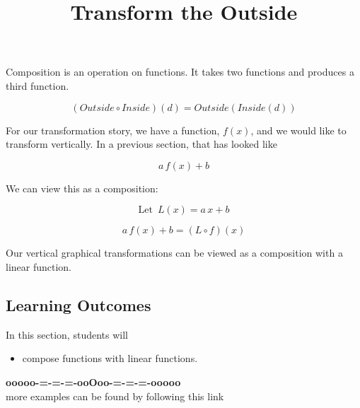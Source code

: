 \documentclass{ximera}
\title{Transform the Outside}
\begin{document}
\begin{abstract}
\end{abstract}
\maketitle









Composition is an operation on functions.  It takes two functions and produces a third function.


\[  (Outside \circ Inside)(d) = Outside(Inside(d))    \]


For our transformation story, we have a function, $f(x)$, and we would like to transform vertically.  In a previous section, that has looked like


\[   a \, f(x) + b  \]


We can view this as a composition:


\[  \text{Let } \, L(x) = a \, x + b   \]


\[   a \, f(x) + b  = (L \circ f)(x)\]



Our vertical graphical transformations can be viewed as a composition with a linear function.





\subsection*{Learning Outcomes}



\begin{sectionOutcomes}
In this section, students will 

\begin{itemize}
\item compose functions with linear functions.
\end{itemize}
\end{sectionOutcomes}












\begin{center}
\textbf{\textcolor{green!50!black}{ooooo-=-=-=-ooOoo-=-=-=-ooooo}} \\

more examples can be found by following this link\\ 

\end{center}
\end{document}
